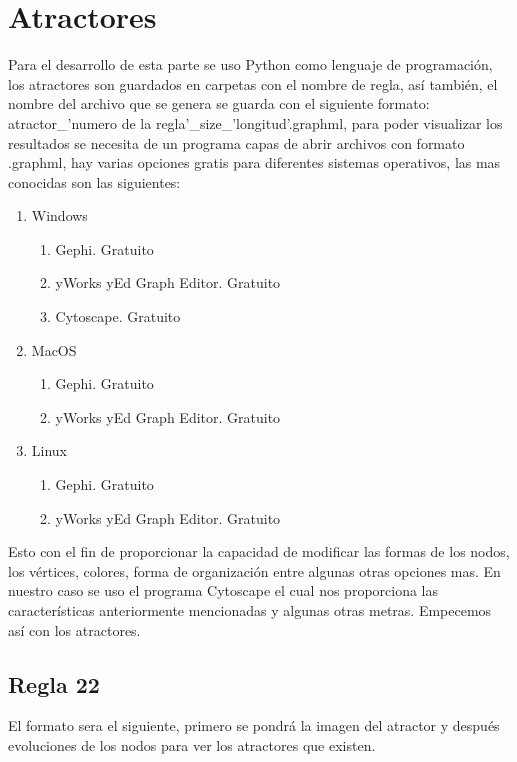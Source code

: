 \documentclass[11pt]{article}
\begin{document}
	\section{Atractores}
	Para el desarrollo de esta parte se uso Python como lenguaje de programación, los atractores son guardados en carpetas con el nombre de regla, así también, el nombre del archivo que se genera se guarda con el siguiente formato: atractor\_'numero de la regla'\_size\_'longitud'.graphml, para poder visualizar los resultados se necesita de un programa capas de abrir archivos con formato .graphml, hay varias opciones gratis para diferentes sistemas operativos, las mas conocidas son las siguientes:
		\begin{enumerate}    
  			\item Windows
  				\begin{enumerate}
    				\item Gephi. Gratuito
    				\item yWorks yEd Graph Editor. Gratuito
    				\item Cytoscape. Gratuito
    			\end{enumerate}
  			\item MacOS
  				\begin{enumerate}
    				\item Gephi. Gratuito
    				\item yWorks yEd Graph Editor. Gratuito
    			\end{enumerate}
  			\item Linux
  				\begin{enumerate}
    				\item Gephi. Gratuito
    				\item yWorks yEd Graph Editor. Gratuito
    			\end{enumerate}
		\end{enumerate}
		Esto con el fin de proporcionar la capacidad de modificar las formas de los nodos, los vértices, colores, forma de organización entre algunas otras opciones mas. En nuestro caso se uso el programa Cytoscape el cual nos proporciona las características anteriormente mencionadas y algunas otras metras. Empecemos así con los atractores.
		\subsection{Regla 22}
		El formato sera el siguiente, primero se pondrá la imagen del atractor y después evoluciones de los nodos para ver los atractores que existen.
\end{document}
